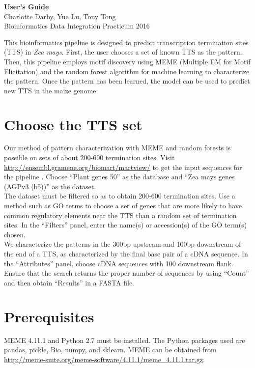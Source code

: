 \documentclass[12pt,letterpaper]{report}
\author{Charlotte Darby}
\begin{document}
\begin{center}
{\huge \textbf{User's Guide}}\\
Charlotte Darby, Yue Lu, Tony Tong\\
Bioinformatics Data Integration Practicum 2016\\
\end{center}

This bioinformatics pipeline is designed to predict transcription termination sites (TTS) in \textsl{Zea mays}. First, the user chooses a set of known TTS as the pattern. Then, this pipeline employs motif discovery using MEME (Multiple EM for Motif Elicitation) \cite{meme} and the random forest algorithm for machine learning \cite{rf} to characterize the pattern. Once the pattern has been learned, the model can be used to predict new TTS in the maize genome.

\section*{Choose the TTS set}

Our method of pattern characterization with MEME and random forests is possible on sets of about 200-600 termination sites. Visit \url{http://ensembl.gramene.org/biomart/martview/} to get the input sequences for the pipeline \cite{biomart}. Choose ``Plant genes 50'' as the database and ``Zea mays genes (AGPv3 (b5))'' as the dataset.\\
\indent The dataset must be filtered so as to obtain 200-600 termination sites. Use a method such as GO terms to choose a set of genes that are more likely to have common regulatory elements near the TTS than a random set of termination sites. In the ``Filters'' panel, enter the name(s) or accession(s) of the GO term(s) chosen.\\
\indent We characterize the patterns in the 300bp upstream and 100bp downstream of the end of a TTS, as characterized by the final base pair of a cDNA sequence. In the ``Attributes'' panel, choose cDNA sequences with 100 downstream flank. Ensure that the search returns the proper number of sequences by using ``Count'' and then obtain ``Results'' in a FASTA file. 

\section*{Prerequisites}
MEME 4.11.1 and Python 2.7 must be installed. The Python packages used are pandas, pickle, Bio, numpy, and sklearn. MEME can be obtained from \url{http://meme-suite.org/meme-software/4.11.1/meme_4.11.1.tar.gz}.
\end{document}

